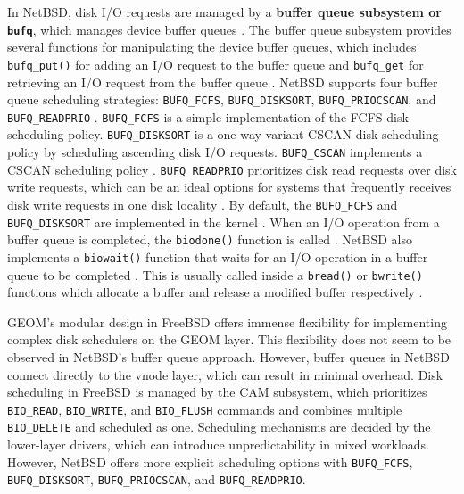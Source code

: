 In NetBSD, disk I/O requests are managed by a \textbf{buffer queue subsystem or \texttt{bufq}}, which manages device buffer
queues \parencite{netbsd_bufq}. The buffer queue subsystem provides several functions for manipulating the device buffer
queues, which includes \texttt{bufq\_put()} for adding an I/O request to the buffer queue and \texttt{bufq\_get} for retrieving
an I/O request from the buffer queue \parencites{netbsd_bufq}{chung2002}. NetBSD supports four buffer queue scheduling
strategies: \texttt{BUFQ\_FCFS}, \texttt{BUFQ\_DISKSORT}, \texttt{BUFQ\_PRIOCSCAN}, and \texttt{BUFQ\_READPRIO}
\parencites{netbsd_bufq}{netbsd_sysctl}{netbsd_options}. \texttt{BUFQ\_FCFS} is a simple implementation of the FCFS disk
scheduling policy. \texttt{BUFQ\_DISKSORT} is a one-way variant CSCAN disk scheduling policy by scheduling ascending
disk I/O requests. \texttt{BUFQ\_CSCAN} implements a CSCAN scheduling policy \parencite{netbsd_options}. \texttt{BUFQ\_READPRIO}
prioritizes disk read requests over disk write requests, which can be an ideal options for systems that frequently receives
disk write requests in one disk locality \parencite{netbsd_options}. By default, the \texttt{BUFQ\_FCFS} and \texttt{BUFQ\_DISKSORT}
are implemented in the kernel \parencite{netbsd_bufq}. When an I/O operation from a buffer queue is completed, the \texttt{biodone()}
function is called \parencite{chung2002}. NetBSD also implements a \texttt{biowait()} function that waits for an I/O operation
in a buffer queue to be completed \parencite{chung2002}. This is usually called inside a \texttt{bread()} or \texttt{bwrite()}
functions which allocate a buffer and release a modified buffer respectively \parencite{chung2002}.

GEOM's modular design in FreeBSD offers immense flexibility for implementing complex disk schedulers on the GEOM layer. This
flexibility does not seem to be observed in NetBSD's buffer queue approach. However, buffer queues in NetBSD connect directly
to the vnode layer, which can result in minimal overhead. Disk scheduling in FreeBSD is managed by the CAM subsystem, which
prioritizes \texttt{BIO\_READ}, \texttt{BIO\_WRITE}, and \texttt{BIO\_FLUSH} commands and combines multiple \texttt{BIO\_DELETE}
and scheduled as one. Scheduling mechanisms are decided by the lower-layer drivers, which can introduce unpredictability
in mixed workloads. However, NetBSD offers more explicit scheduling options with \texttt{BUFQ\_FCFS}, \texttt{BUFQ\_DISKSORT},
\texttt{BUFQ\_PRIOCSCAN}, and \texttt{BUFQ\_READPRIO}.

